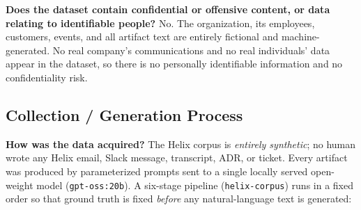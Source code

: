 \textbf{Does the dataset contain confidential or offensive content, or data
relating to identifiable people?}
No. The organization, its employees, customers, events, and all artifact text
are entirely fictional and machine-generated. No real company's communications
and no real individuals' data appear in the dataset, so there is no personally
identifiable information and no confidentiality risk.

\subsection{Collection / Generation Process}

\textbf{How was the data acquired?}
The Helix corpus is \emph{entirely synthetic}; no human wrote any Helix email,
Slack message, transcript, ADR, or ticket. Every artifact was produced by
parameterized prompts sent to a single locally served open-weight model
(\texttt{gpt-oss:20b}). A six-stage pipeline (\texttt{helix-corpus}) runs in a
fixed order so that ground truth is fixed \emph{before} any natural-language text
is generated:

